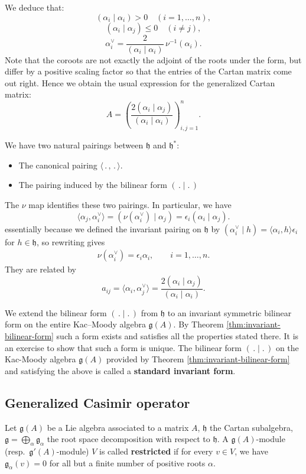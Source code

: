 \documentclass[12pt]{article}
\begin{document}
We deduce that:
\[
    (\alpha_i\mid \alpha_i)>0 \quad (i=1,\dots,n),
\]
\[
    (\alpha_i\mid \alpha_j)\leq 0 \quad (i\neq j),
\]
\[
    \alpha_i^\vee = \frac{2}{(\alpha_i\mid \alpha_i)}\,\nu^{-1}(\alpha_i).
\]
Note that the coroots are not exactly the adjoint of the roots under the form, but differ by a positive scaling factor so that the entries of the Cartan matrix come out right. Hence we obtain the usual expression for the generalized Cartan matrix:
\[
    A=\left(\frac{2(\alpha_i\mid \alpha_j)}{(\alpha_i\mid \alpha_i)}\right)_{i,j=1}^n.
\]

\begin{remark}
    We have two natural pairings between $\mathfrak{h}$ and $\mathfrak{h}^*$:
    \begin{itemize}
        \item The canonical pairing $\langle \,.\,,\,.\,\rangle$.
        \item The pairing induced by the bilinear form $(\,.\mid.\,)$
    \end{itemize}
    The $\nu$ map identifies these two pairings. In particular, we have
    \[
        \langle \alpha_j, \alpha_i^\vee \rangle = (\nu
        (\alpha_i^\vee) \mid \alpha_j) = \epsilon_i (\alpha_i \mid \alpha_j).
    \] essentially because we defined the invariant pairing on $\mathfrak{h}$ by
    $(\alpha_i^\vee \mid h) = \langle \alpha_i, h \rangle \epsilon_i$ for $h \in \mathfrak{h}$, so rewriting gives
    \begin{align*}
        \nu(\alpha_i^\vee) = \epsilon_i \alpha_i,
        \qquad i=1,\ldots,n.
    \end{align*}
    They are related by
    \[
        a_{ij} = \langle \alpha_i, \alpha_j^\vee \rangle = \frac{2(\alpha_i\mid \alpha_j)}{(\alpha_i\mid \alpha_i)}.
    \]
\end{remark}

We extend the bilinear form $(\,.\mid.\,)$ from $\mathfrak h$ to an
invariant symmetric bilinear form on the entire Kac–Moody algebra
$\mathfrak g(A)$. By Theorem \ref{thm:invariant-bilinear-form} such a form exists and satisfies all the properties stated there. It is an exercise to show that such a form is unique. The bilinear form $(\,.\mid.\,)$ on the Kac-Moody algebra $\mathfrak g(A)$ provided by Theorem \ref{thm:invariant-bilinear-form} and
satisfying the above is called a \textbf{standard invariant form}.

\subsection{Generalized Casimir operator}
Let $\mathfrak{g}(A)$ be a Lie algebra associated to a matrix $A$,
$\mathfrak{h}$ the Cartan subalgebra,
$\mathfrak{g} = \bigoplus_\alpha \mathfrak{g}_\alpha$ the root space decomposition with respect to $\mathfrak{h}$.
A $\mathfrak{g}(A)$-module (resp.\ $\mathfrak{g}'(A)$-module) $V$ is called \textbf{restricted} if for every $v\in V$,
we have $\mathfrak{g}_\alpha(v)=0$ for all but a finite number of positive roots $\alpha$.
\end{document}
